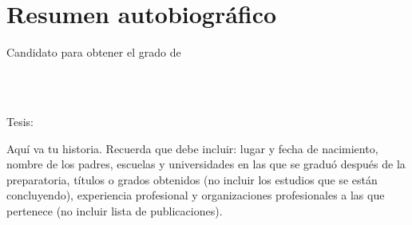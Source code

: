 
\chapter*{Resumen autobiográfico}
\thispagestyle{empty}

\begin{center}
\autor

Candidato para obtener el grado de\\
\grado\\
\orientacion\bigskip

\uanl\\
\fcfm\bigskip

Tesis:\\
\textsc{\large\titulo}
\end{center}\bigskip

Aquí va tu historia. Recuerda que debe incluir: lugar y fecha de nacimiento, nombre de los padres, escuelas y universidades en las que se graduó después de la preparatoria, títulos o grados obtenidos (no incluir los estudios que se están concluyendo), experiencia profesional y organizaciones profesionales a las que pertenece (no incluir lista de publicaciones).
